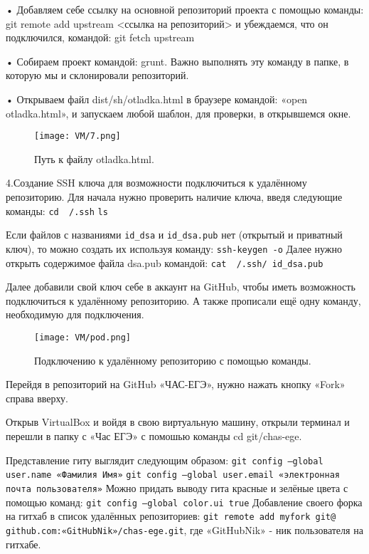• Добавляем себе ссылку на основной репозиторий проекта с помощью команды: git remote add upstream <ссылка на репозиторий> и убеждаемся, что он подключился, командой: git fetch upstream 

• Собираем проект командой: grunt. Важно выполнять эту команду в папке, в которую мы и склонировали репозиторий.

• Открываем файл dist/sh/otladka.html в браузере командой: «open otladka.html», и запускаем любой шаблон, для проверки, в открывшемся окне.


\begin{figure}[h]
		\centering
		\texttt{[image: VM/7.png]}
\caption{Путь к файлу otladka.html.}
\label{ris:image}
\end{figure}

4.\quad  Создание SSH ключа для возможности подключиться к удалённому репозиторию.
Для начала нужно проверить наличие ключа, введя следующие команды:
\newline \texttt{cd ~/.ssh}
\newline \texttt{ls}

Если файлов с названиями \texttt{id\_dsa} и \texttt{id\_dsa.pub} нет (открытый и приватный ключ), то можно создать их используя команду:
\newline  \texttt{ssh-keygen -o}
\newline \quad Далее нужно открыть содержимое файла dsa.pub командой:
\newline  \texttt{cat ~/.ssh/ id\_dsa.pub}

Далее добавили свой ключ себе в аккаунт на GitHub, чтобы иметь возможность подключиться к удалённому репозиторию. А также прописали ещё одну команду, необходимую для подключения.

\begin{figure}[h]
		\centering
		\texttt{[image: VM/pod.png]}
\caption{Подключению к удалённому репозиторию с помощью команды.}
\label{ris:image}
\end{figure}

Перейдя в репозиторий на GitHub «ЧАС-ЕГЭ», нужно нажать кнопку «Fork» справа вверху.

Открыв VirtualBox и войдя в свою виртуальную машину, открыли терминал и перешли в папку с «Час ЕГЭ» с помошью команды cd git/chas-ege.

Представление гиту выглядит следующим образом:
\newline \texttt{git config --global user.name «Фамилия Имя»}
\newline \texttt{git config --global user.email «электронная почта пользователя»}
\newline Можно придать выводу гита красные и зелёные цвета с помощью команд:
\texttt{git config --global color.ui true}
\newline Добавление своего форка на гитхаб в список удалённых репозиториев:
\texttt{git remote add myfork git@ github.com:«GitHubNik»/chas-ege.git}, где «GitHubNik» - ник пользователя на гитхабе. 

